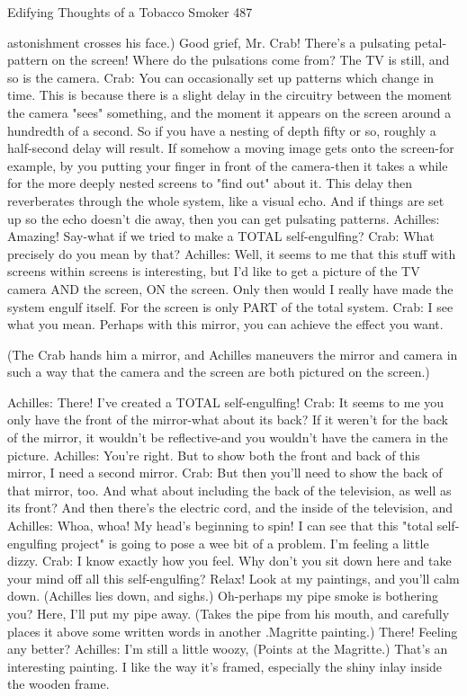 {Edifying Thoughts of a Tobacco Smoker                                                      487

  astonishment crosses his face.) Good grief, Mr. Crab! There's a pulsating petal-pattern
  on the screen! Where do the pulsations come from? The TV is still, and so is the
  camera.
Crab: You can occasionally set up patterns which change in time. This is because there is
  a slight delay in the circuitry between the moment the camera "sees" something, and
  the moment it appears on the screen around a hundredth of a second. So if you have a
  nesting of depth fifty or so, roughly a half-second delay will result. If somehow a
  moving image gets onto the screen-for example, by you putting your finger in front of
  the camera-then it takes a while for the more deeply nested screens to "find out" about
  it. This delay then reverberates through the whole system, like a visual echo. And if
  things are set up so the echo doesn't die away, then you can get pulsating patterns.
Achilles: Amazing! Say-what if we tried to make a TOTAL self-engulfing?
Crab: What precisely do you mean by that?
Achilles: Well, it seems to me that this stuff with screens within screens is interesting, but
  I'd like to get a picture of the TV camera AND the screen, ON the screen. Only then
  would I really have made the system engulf itself. For the screen is only PART of the
  total system.
Crab: I see what you mean. Perhaps with this mirror, you can achieve the effect you
  want.

   (The Crab hands him a mirror, and Achilles maneuvers the mirror and camera in such
   a way that the camera and the screen are both pictured on the screen.)

Achilles: There! I've created a TOTAL self-engulfing!
Crab: It seems to me you only have the front of the mirror-what about its back? If it
  weren't for the back of the mirror, it wouldn't be reflective-and you wouldn't have the
  camera in the picture.
Achilles: You're right. But to show both the front and back of this mirror, I need a second
  mirror.
Crab: But then you'll need to show the back of that mirror, too. And what about including
  the back of the television, as well as its front? And then there's the electric cord, and
  the inside of the television, and
Achilles: Whoa, whoa! My head's beginning to spin! I can see that this "total self-
  engulfing project" is going to pose a wee bit of a problem. I'm feeling a little dizzy.
Crab: I know exactly how you feel. Why don't you sit down here and take your mind off
  all this self-engulfing? Relax! Look at my paintings, and you'll calm down.
(Achilles lies down, and sighs.)
Oh-perhaps my pipe smoke is bothering you? Here, I'll put my pipe away. (Takes the pipe
  from his mouth, and carefully places it above some written words in another .Magritte
  painting.) There! Feeling any better?
Achilles: I’m still a little woozy, (Points at the Magritte.) That’s an interesting painting. I
  like the way it’s framed, especially the shiny inlay inside the wooden frame.




}
